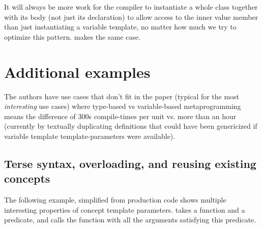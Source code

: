 \documentclass{wg21}
\begin{document}
It will always be more work for the compiler to instantiate a whole class together with its body (not just its declaration) to allow access to the inner value member than just instantiating a variable template, no matter how much we try to optimize this pattern.  makes the same case.

\section{Additional examples}

The authors have use cases that don't fit in the paper (typical for the most \emph{interesting} use cases) where type-based vs variable-based metaprogramming means the difference of 300s compile-times per unit vs. more than an hour (currently by textually duplicating definitions that could have been genericized if variable template template-parameters were available).

%
%
%
%
%
%
%
%
%
%

\pagebreak

\subsection{Terse syntax, overloading, and reusing existing concepts}

The following example, simplified from production code shows multiple interesting properties of concept template parameters.
 takes a function and a predicate, and calls the function with all the arguments satisfying this predicate.
\end{document}
